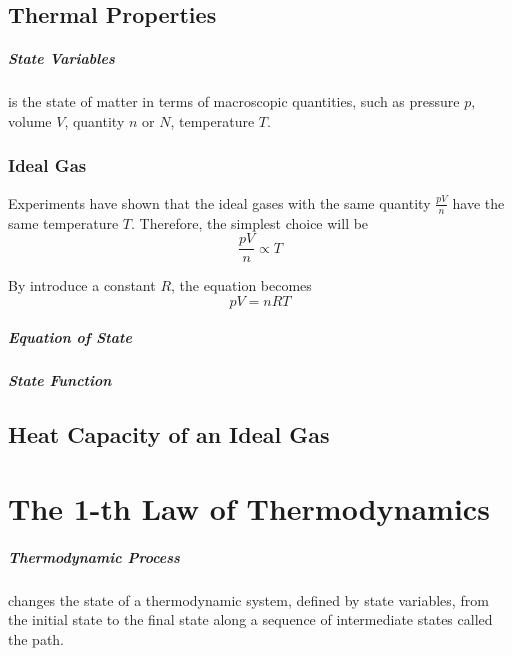 \documentclass{note}
\begin{document}
\section{Thermal Properties}

\paragraph{State Variables} is the state of matter in terms of macroscopic quantities, such as pressure \(p\), volume \(V\), quantity \(n\) or \(N\), temperature \(T\).

\subsection{Ideal Gas}

Experiments have shown that the ideal gases with the same quantity $\frac{pV}{n}$ have the same temperature $T$. Therefore, the simplest choice will be
\begin{equation*}
    \frac{pV}{n} \propto T
\end{equation*}

By introduce a constant $R$, the equation becomes
\begin{equation*}
    pV = nRT
\end{equation*}

\paragraph{Equation of State}

\paragraph{State Function}

\section{Heat Capacity of an Ideal Gas}

\chapter{The 1-th Law of Thermodynamics}

\paragraph{Thermodynamic Process} changes the state of a thermodynamic system, defined by state variables, from the initial state to the final state along a sequence of intermediate states called the path.
\end{document}
